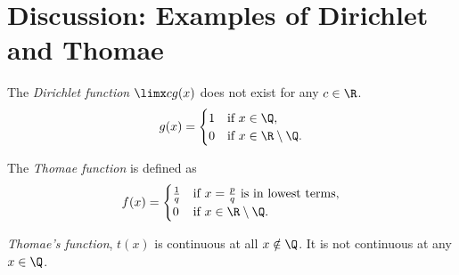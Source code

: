 \label{sec:Thomae}
\section{Discussion: Examples of Dirichlet and Thomae}

\begin{definition}
    The \textit{Dirichlet function} \(\limx c{g(x)}\) does not exist for any \(c \in \R\).
    \[
        g(x) = \begin{cases}
            1 & \text{if } x \in \Q,              \\
            0 & \text{if } x \in \R \setminus \Q.
        \end{cases}
    \]
\end{definition}
\begin{center}

\end{center}

\begin{definition}
    The \textit{Thomae function} is defined as
    \[
        f(x) = \begin{cases}
            \frac{1}{q} & \text{if } x = \frac{p}{q} \text{ is in lowest terms}, \\
            0           & \text{if } x \in \R \setminus \Q.
        \end{cases}
    \]
\end{definition}

\textit{Thomae's function}, \(t(x)\) is continuous at all \(x \notin \Q\). It is not continuous at any \(x \in \Q\).

\newpage

